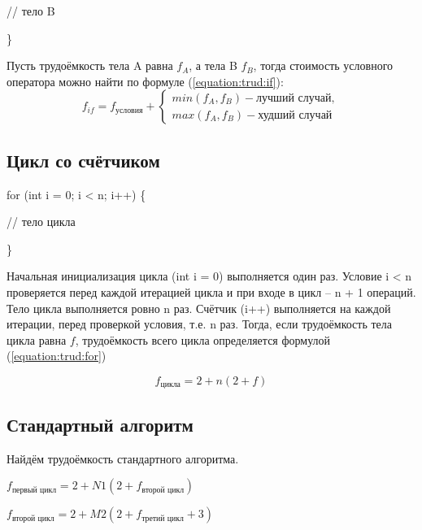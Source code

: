 \documentclass[utf8x, 12pt]{G7-32}
\begin{document}
                // тело B
            
            \}

            Пусть трудоёмкость тела A равна $ f_A $, а тела B $ f_B $, тогда
            стоимость условного оператора можно найти по формуле (\ref{equation:trud:if}):
            \begin{equation}
                f_{if} = f_\text{условия} + \left\{
                    \begin{matrix}
                    min(f_A, f_B) - \text{лучший случай},\\
                    max(f_A, f_B) - \text{худший случай} 
                    \end{matrix}\right.
                \label{equation:trud:if}
            \end{equation}

        \subsection{Цикл со счётчиком}
            for (int i = 0; i < n; i++) \{

                // тело цикла

            \}
            
            Начальная инициализация цикла (int i = 0) выполняется один раз.
            Условие i < n проверяется перед каждой итерацией цикла и при входе в цикл -- n + 1 операций.
            Тело цикла выполняется ровно n раз.
            Счётчик (i++) выполняется на каждой итерации, перед проверкой условия, т.е. n раз.
            Тогда, если трудоёмкость тела цикла равна $ f $, трудоёмкость всего цикла определяется формулой (\ref{equation:trud:for})

            \begin{equation}
                f_\text{цикла} = 2 + n(2 + f)
                \label{equation:trud:for}
            \end{equation}


\newpage
\subsection{Стандартный алгоритм}
            Найдём трудоёмкость стандартного алгоритма.
            
            $ f_\text{первый цикл} = 2 + N1(2 + f_\text{второй цикл})$  

            $ f_\text{второй цикл} = 2 + M2(2 + f_\text{третий цикл} + 3)$  
\end{document}
